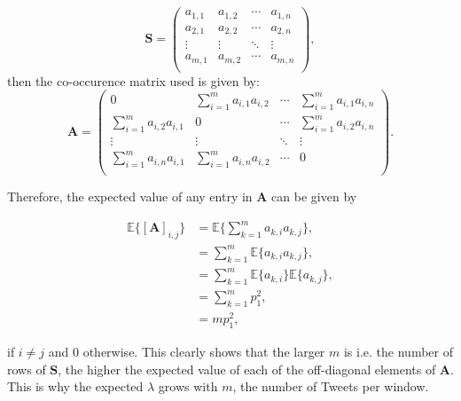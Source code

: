 \documentclass[11pt,a4paper]{article}
\newcommand{\smat}{\mathbf{S}}
\newcommand{\covmat}{\mathbf{A}}
\begin{document}
\begin{equation*}
\smat = \left( \begin{matrix}
a_{1, 1} & a_{1, 2} & \cdots & a_{1, n} \\ 
a_{2, 1} & a_{2, 2} & \cdots &  a_{2, n} \\
\vdots & \vdots & \ddots & \vdots \\
a_{m, 1} & a_{m, 2} &\cdots &  a_{m, n} \\

\end{matrix} \right),
\end{equation*}
 then the co-occurence matrix used is given by:
\begin{equation*}
\covmat =
\left( \begin{matrix}
0 & \sum_{i=1}^m a_{i,1} a_{i,2} & \cdots & \sum_{i=1}^m a_{i,1} a_{i,n}\\ 
\sum_{i=1}^m a_{i,2} a_{i,1}  & 0& \cdots & \sum_{i=1}^m a_{i,2} a_{i,n}\\ 
\vdots & \vdots& \ddots & \vdots \\ 
\sum_{i=1}^m a_{i,n} a_{i,1} & \sum_{i=1}^m a_{i,n} a_{i,2} & \cdots & 0\\ 
\end{matrix} \right).
\end{equation*}

Therefore, the expected value of any entry in $\covmat$ can be given by

\begin{align*}
\mathbb{E}\{[\covmat]_{i, j}\} & =  \mathbb{E}\{\sum_{k=1}^m a_{k,i} a_{k,j}\},\\
& =  \sum_{k=1}^m \mathbb{E}\{ a_{k,i} a_{k,j}\},\\
& =  \sum_{k=1}^m \mathbb{E}\{ a_{k,i}\}\mathbb{E}\{ a_{k,j}\},\\
 & =   \sum_{k=1}^m p_1^2, \\
 & =   mp_1^2,
\end{align*}

if $i \neq j$ and 0 otherwise. This clearly shows that the larger $m$ is i.e. the number of rows of $\smat$, the higher the expected value of each of the off-diagonal elements of $\covmat$. This is why the expected $\lambda$ grows with $m$, the number of Tweets per window.
\end{document}
